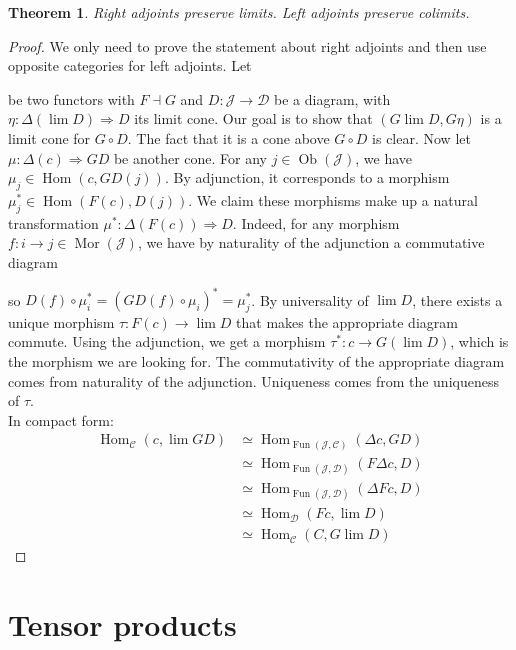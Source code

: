 \documentclass{article}
\newcommand{\cat}{\mathcal{C}}
\newcommand{\catt}{\mathcal{D}}
\newcommand{\Jcat}{\mathcal{J}}
\DeclareMathOperator{\Ob}{Ob}
\DeclareMathOperator{\Mor}{Mor}
\DeclareMathOperator{\Hom}{Hom}
\DeclareMathOperator{\Fun}{Fun}
\theoremstyle{plain}
\newtheorem{theorem}{Theorem}[section]
\theoremstyle{definition}
\theoremstyle{remark}
\begin{document}
\begin{theorem}
    Right adjoints preserve limits. Left adjoints preserve colimits.
\end{theorem}

\begin{proof}
    We only need to prove the statement about right adjoints and then use opposite categories for left adjoints. Let  be two functors with $F \dashv G$ and $D : \Jcat \to \catt$ be a diagram, with $\eta : \Delta(\lim D) \Rightarrow D$ its limit cone. Our goal is to show that $(G\lim D,G\eta)$ is a limit cone for $G\circ D$. The fact that it is a cone above $G \circ D$ is clear. Now let $\mu : \Delta(c) \Rightarrow GD$ be another cone. For any $j \in \Ob(\Jcat)$, we have $\mu_j \in \Hom(c,GD(j))$. By adjunction, it corresponds to a morphism $\mu_j^* \in \Hom(F(c),D(j))$. We claim these morphisms make up a natural transformation $\mu^* : \Delta(F(c)) \Rightarrow D$. Indeed, for any morphism $f : i \to j \in \Mor(\Jcat)$, we have by naturality of the adjunction a commutative diagram
    \begin{center}
    \end{center}
    so $D(f) \circ \mu_i^* = (GD(f)\circ \mu_i)^* = \mu_j^*$. By universality of $\lim D$, there exists a unique morphism $\tau : F(c) \to \lim D$ that makes the appropriate diagram commute. Using the adjunction, we get a morphism $\tau^* : c \to G(\lim D)$, which is the morphism we are looking for. The commutativity of the appropriate diagram comes from naturality of the adjunction. Uniqueness comes from the uniqueness of $\tau$. \\
    In compact form:
    \begin{align*}
        \Hom_\cat (c,\lim GD) & \simeq \Hom_{\Fun(\Jcat,\cat)} (\Delta c,GD) \\
        & \simeq \Hom_{\Fun(\Jcat,\catt)}(F\Delta c,D) \\
        & \simeq \Hom_{\Fun(\Jcat,\catt)}(\Delta F c,D) \\
        & \simeq \Hom_\catt (Fc, \lim D) \\
        & \simeq \Hom_\cat (C,G \lim D)
    \end{align*}
\end{proof}

\section{Tensor products}
\end{document}
